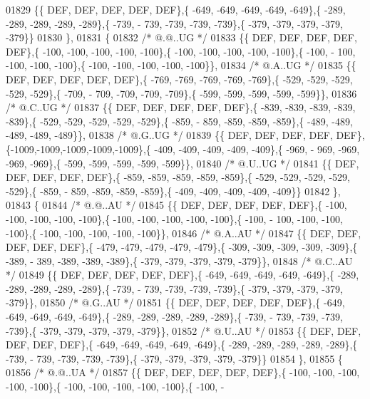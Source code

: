 \begin{DoxyCode}
01829 \{\{  DEF,  DEF,  DEF,  DEF,  DEF\},\{ -649, -649, -649, -649, -649\},\{ -289, -289, -289, -289, -289\},\{ -739, -
      739, -739, -739, -739\},\{ -379, -379, -379, -379, -379\}\}
01830 \},
01831 \{
01832 \textcolor{comment}{/*  @.@..UG */}
01833 \{\{  DEF,  DEF,  DEF,  DEF,  DEF\},\{ -100, -100, -100, -100, -100\},\{ -100, -100, -100, -100, -100\},\{ -100, -
      100, -100, -100, -100\},\{ -100, -100, -100, -100, -100\}\},
01834 \textcolor{comment}{/*  @.A..UG */}
01835 \{\{  DEF,  DEF,  DEF,  DEF,  DEF\},\{ -769, -769, -769, -769, -769\},\{ -529, -529, -529, -529, -529\},\{ -709, -
      709, -709, -709, -709\},\{ -599, -599, -599, -599, -599\}\},
01836 \textcolor{comment}{/*  @.C..UG */}
01837 \{\{  DEF,  DEF,  DEF,  DEF,  DEF\},\{ -839, -839, -839, -839, -839\},\{ -529, -529, -529, -529, -529\},\{ -859, -
      859, -859, -859, -859\},\{ -489, -489, -489, -489, -489\}\},
01838 \textcolor{comment}{/*  @.G..UG */}
01839 \{\{  DEF,  DEF,  DEF,  DEF,  DEF\},\{-1009,-1009,-1009,-1009,-1009\},\{ -409, -409, -409, -409, -409\},\{ -969, -
      969, -969, -969, -969\},\{ -599, -599, -599, -599, -599\}\},
01840 \textcolor{comment}{/*  @.U..UG */}
01841 \{\{  DEF,  DEF,  DEF,  DEF,  DEF\},\{ -859, -859, -859, -859, -859\},\{ -529, -529, -529, -529, -529\},\{ -859, -
      859, -859, -859, -859\},\{ -409, -409, -409, -409, -409\}\}
01842 \},
01843 \{
01844 \textcolor{comment}{/*  @.@..AU */}
01845 \{\{  DEF,  DEF,  DEF,  DEF,  DEF\},\{ -100, -100, -100, -100, -100\},\{ -100, -100, -100, -100, -100\},\{ -100, -
      100, -100, -100, -100\},\{ -100, -100, -100, -100, -100\}\},
01846 \textcolor{comment}{/*  @.A..AU */}
01847 \{\{  DEF,  DEF,  DEF,  DEF,  DEF\},\{ -479, -479, -479, -479, -479\},\{ -309, -309, -309, -309, -309\},\{ -389, -
      389, -389, -389, -389\},\{ -379, -379, -379, -379, -379\}\},
01848 \textcolor{comment}{/*  @.C..AU */}
01849 \{\{  DEF,  DEF,  DEF,  DEF,  DEF\},\{ -649, -649, -649, -649, -649\},\{ -289, -289, -289, -289, -289\},\{ -739, -
      739, -739, -739, -739\},\{ -379, -379, -379, -379, -379\}\},
01850 \textcolor{comment}{/*  @.G..AU */}
01851 \{\{  DEF,  DEF,  DEF,  DEF,  DEF\},\{ -649, -649, -649, -649, -649\},\{ -289, -289, -289, -289, -289\},\{ -739, -
      739, -739, -739, -739\},\{ -379, -379, -379, -379, -379\}\},
01852 \textcolor{comment}{/*  @.U..AU */}
01853 \{\{  DEF,  DEF,  DEF,  DEF,  DEF\},\{ -649, -649, -649, -649, -649\},\{ -289, -289, -289, -289, -289\},\{ -739, -
      739, -739, -739, -739\},\{ -379, -379, -379, -379, -379\}\}
01854 \},
01855 \{
01856 \textcolor{comment}{/*  @.@..UA */}
01857 \{\{  DEF,  DEF,  DEF,  DEF,  DEF\},\{ -100, -100, -100, -100, -100\},\{ -100, -100, -100, -100, -100\},\{ -100, -

\end{DoxyCode}
